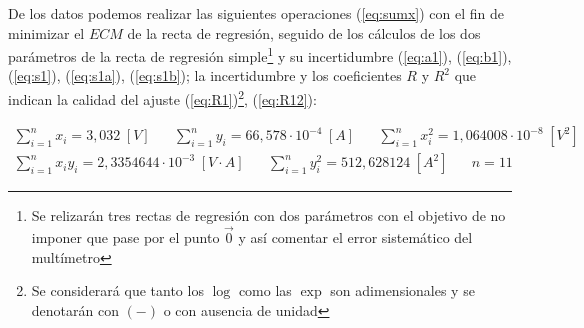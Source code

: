 \documentclass[11pt]{report}
\begin{document}
\begin{refsection}
De los datos podemos realizar las siguientes operaciones (\ref{eq:sumx}) 
con el fin de minimizar el $ECM$ de la recta de regresión, seguido de los cálculos de los dos parámetros de la 
recta de regresión simple\footnote{Se relizarán tres rectas de regresión con dos parámetros con el objetivo de
no imponer que pase por el punto $\vec{0}$ y así comentar el error sistemático del multímetro}
y su incertidumbre (\ref{eq:a1}), (\ref{eq:b1}), (\ref{eq:s1}), (\ref{eq:s1a}), (\ref{eq:s1b});
la incertidumbre y los coeficientes $R$ y $R^2$ que indican la calidad del ajuste (\ref{eq:R1})\footnote{Se considerará que tanto los $\log$ como las $\exp$ son adimensionales y 
se denotarán con $(-)$ o con ausencia de unidad}, (\ref{eq:R12}):

\begin{center}
\begin{equation}
\begin{split}
    \sum^n_{i=1} x_i = 3,032 \hspace{3pt}[V] \hspace{20pt}
    \sum^n_{i=1} y_i = 66,578 \cdot 10^{-4} \hspace{3pt}[A]\hspace{20pt}
    \sum^n_{i=1} x_i^2 = 1,064008 \cdot 10^{-8} \hspace{3pt} [V^2] \hspace{20pt} \\
    \sum^n_{i=1} x_i y_i = 2,3354644 \cdot 10^{-3} \hspace{3pt} [V\cdot A] \hspace{20pt}
    \sum^n_{i=1} y_i^2 = 512,628124 \hspace{3pt}[A^2] \hspace{20pt}
    n=11\hspace{20pt}
    \label{eq:sumx}
\end{split}
\end{equation}
\end{center}


\end{refsection}
\end{document}
